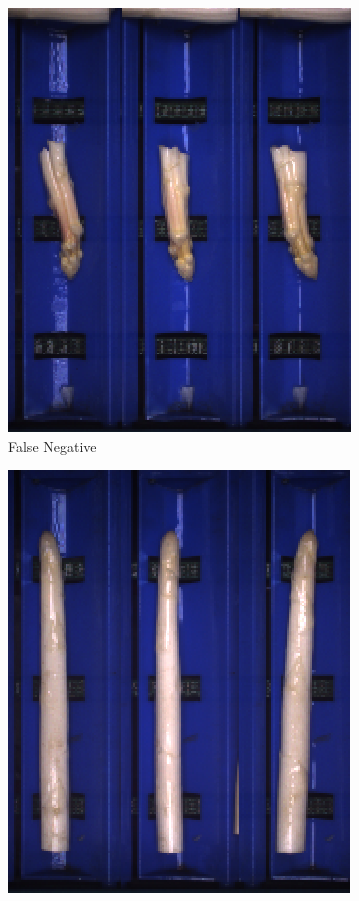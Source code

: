 \begin{figure}[h]
	\centering
	\begin{subfigure}{0.3\textwidth}
		\includegraphics[width=0.9\linewidth]{Figures/appendix/thin_falsenegative_01.png} 
		\vspace{-5pt}
		\caption{False Negative}
	\end{subfigure}
	\begin{subfigure}{0.3\textwidth}
		\includegraphics[width=0.9\linewidth]{Figures/appendix/thin_falsenegative_02.png}

\end{subfigure}
\end{figure}
